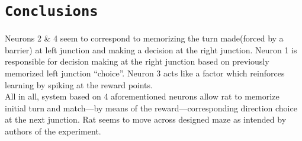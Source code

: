 \documentclass[11pt,a4paper,twocolumn]{article}
\begin{document}
\section*{\texttt{Conclusions}}
Neurons 2 \& 4 seem to correspond to memorizing the turn made(forced by a barrier) at left junction and making a decision at the right junction. Neuron 1 is responsible for decision making at the right junction based on previously memorized left junction ``choice''. Neuron 3 acts like a factor which reinforces learning by spiking at the reward points.\\
All in all, system based on 4 aforementioned neurons allow rat to memorize initial turn and match---by means of the reward---corresponding direction choice at the next junction. Rat seems to move across designed maze as intended by authors of the experiment.\\
\end{document}
